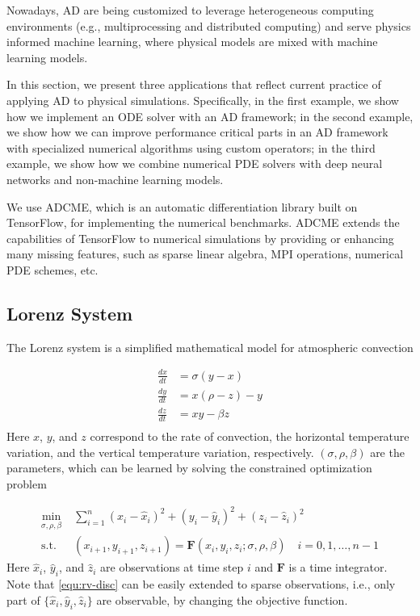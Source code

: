 \documentclass[3p,preprint,12pt]{elsarticle}
\begin{document}
Nowadays, AD are being customized to leverage heterogeneous computing environments (e.g., multiprocessing and distributed computing) and serve physics informed machine learning, where physical models are mixed with machine learning models. 

In this section, we present three applications that reflect current practice of applying AD to physical simulations. Specifically, in the first example, we show how we implement an ODE solver with an AD framework; in the second example, we show how we can improve performance critical parts in an AD framework with specialized numerical algorithms  using custom operators; in the third example, we show how we combine numerical PDE solvers with deep neural networks and non-machine learning models. 

We use ADCME, which is an automatic differentiation library built on TensorFlow, for implementing the numerical benchmarks. ADCME extends the capabilities of TensorFlow to numerical simulations by providing or enhancing many missing features, such as sparse linear algebra, MPI operations, numerical PDE schemes, etc. 


\subsection{Lorenz System}

The Lorenz system is a simplified mathematical model for atmospheric convection

\begin{equation}
    \begin{aligned}
    \frac{d x}{dt} &= \sigma (y-x)\\
    \frac{d y}{dt} &= x(\rho - z) - y\\
    \frac{d z}{dt} &= xy - \beta z\\
    \end{aligned}
\end{equation}
Here $x$, $y$, and $z$ correspond to the rate of convection, the horizontal temperature variation, and the vertical temperature variation, respectively. $(\sigma, \rho, \beta)$ are the parameters, which can be learned by solving the constrained optimization problem 

\begin{equation}\label{equ:rv-disc}
    \begin{aligned}
    \min_{\sigma, \rho, \beta} &\; \sum_{i=1}^n (x_i - \hat x_i)^2 + (y_i - \hat y_i)^2 + (z_i - \hat z_i)^2 \\ 
    \text{s.t.} &\; (x_{i+1}, y_{i+1}, z_{i+1}) = \mathbf{F}(x_i, y_i, z_i; \sigma, \rho, \beta) \quad i = 0, 1, \ldots, n-1
    \end{aligned}
\end{equation}
Here $\hat x_i$, $\hat y_i$, and $\hat z_i$ are observations at time step $i$ and $\mathbf{F}$ is a time integrator. Note that \cref{equ:rv-disc} can be easily extended to sparse observations, i.e., only part of $\{\hat x_i, \hat y_i, \hat z_i\}$ are observable, by changing the objective function. 
\end{document}
